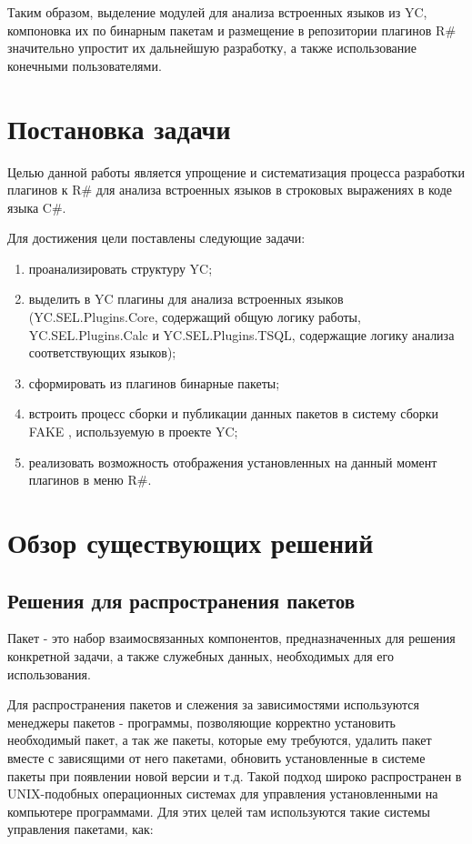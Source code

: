 \documentclass{matmex-diploma}
\begin{document}
Таким образом, выделение модулей для анализа встроенных языков из YC, компоновка их по бинарным пакетам и размещение в репозитории плагинов R\# значительно упростит их дальнейшую разработку, а также использование конечными пользователями.

\section{Постановка задачи}

Целью данной работы является упрощение и систематизация процесса разработки плагинов к R\# для анализа встроенных языков в строковых выражениях в коде языка C\#.

Для достижения цели поставлены следующие задачи:

\begin{enumerate}
\item
проанализировать структуру YC;
\item
выделить в YC плагины для анализа встроенных языков (YC.SEL.Plugins.Core, содержащий общую логику работы, YC.SEL.Plugins.Calc и YC.SEL.Plugins.TSQL, содержащие логику анализа соответствующих языков);
\item
сформировать из плагинов бинарные пакеты;
\item
встроить процесс сборки и публикации данных пакетов в систему сборки FAKE \cite{fake}, используемую в проекте YC;
\item
реализовать возможность отображения установленных на данный момент плагинов в меню R\#.
\end{enumerate}

\section{Обзор существующих решений}

\subsection{Решения для распространения пакетов}

Пакет - это набор взаимосвязанных компонентов, предназначенных для решения конкретной задачи, а также служебных данных, необходимых для его использования.

Для распространения пакетов и слежения за зависимостями используются менеджеры пакетов - программы, позволяющие корректно установить необходимый пакет, а так же пакеты, которые ему требуются, удалить пакет вместе с зависящими от него пакетами, обновить установленные в системе пакеты при появлении новой версии и т.д. Такой подход широко распространен в UNIX-подобных операционных системах для управления установленными на компьютере программами. Для этих целей там используются такие системы управления пакетами, как:
\end{document}
